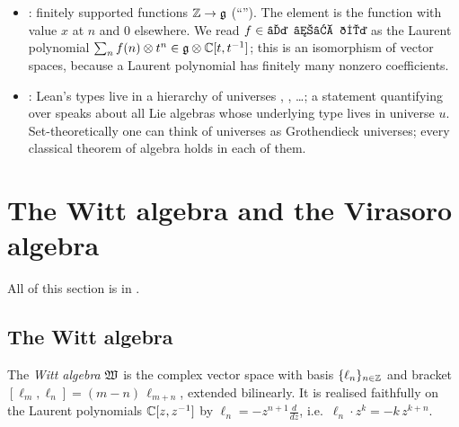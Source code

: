 \begin{itemize}
  multiplication).  is the left ideal $\sum_{s\in S}Rs$ generated by $S$.
  The quotient type  is the left $R$-module $R/I$, and
   is the class $[a]$.
\item {}: finitely supported functions ${\mathbb{Z}}\to\mathfrak{g}$ (``''). The element
   is the function with value $x$ at $n$ and $0$ elsewhere. We read
  $f\in\lean{ℤ →₀ 𝔤}$ as the Laurent polynomial $\sum_n f(n)\otimes t^n\in\mathfrak{g}\otimes{\mathbb{C}}[t,t^{-1}]$;
  this is an isomorphism of vector spaces, because a Laurent polynomial has finitely many nonzero
  coefficients.
\item {}: Lean's types live in a hierarchy of universes , ,
  \ldots; a statement quantifying over  speaks about all Lie algebras whose
  underlying type lives in universe $u$. Set-theoretically one can think of universes as Grothendieck
  universes; every classical theorem of algebra holds in each of them.
\end{itemize}

\section{The Witt algebra and the Virasoro algebra}\label{l02:sec:witt}

All of this section is in .

\subsection{The Witt algebra}

\begin{definition}\label{l02:def:witt}
The \emph{Witt algebra} $\mathfrak{W}$ is the complex vector space with basis $\{\ell_n\}_{n\in{\mathbb{Z}}}$ and
bracket $[\ell_m,\ell_n] = (m-n)\,\ell_{m+n}$, extended bilinearly. It is realised faithfully on the
Laurent polynomials ${\mathbb{C}}[z,z^{-1}]$ by $\ell_n = -z^{n+1}\frac{d}{dz}$, i.e.\
$\ell_n\cdot z^k = -k\,z^{k+n}$.
\end{definition}

